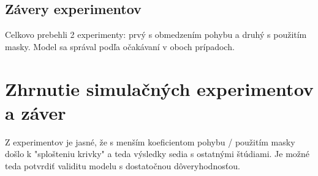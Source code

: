 \documentclass[11pt,a4paper,titlepage]{article}
\begin{document}
\subsection{Závery experimentov}
Celkovo prebehli 2 experimenty: prvý s obmedzením pohybu a druhý s použitím masky. Model sa správal podľa očakávaní v oboch prípadoch.

\section{Zhrnutie simulačných experimentov a záver}
Z experimentov je jasné, že s menším koeficientom pohybu / použitím masky došlo k "splošteniu krivky" a teda výsledky sedia s ostatnými štúdiami. Je možné teda potvrdiť validitu modelu s dostatočnou dôveryhodnosťou. \cite{Experiment1}

\newpage
\renewcommand{\refname}{Referencie}

\end{document}
